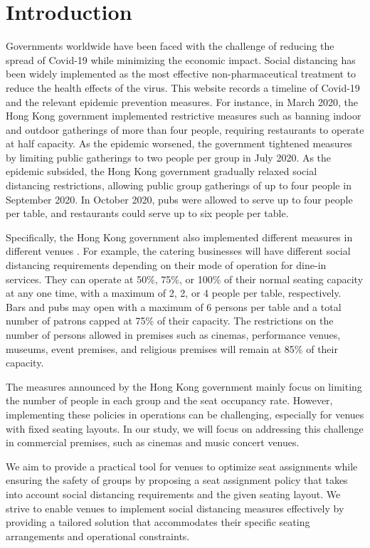\section{Introduction}
Governments worldwide have been faced with the challenge of reducing the spread of Covid-19 while minimizing the economic impact. Social distancing has been widely implemented as the most effective non-pharmaceutical treatment to reduce the health effects of the virus. 
This website records a timeline of Covid-19 and the relevant epidemic prevention measures\cite{Covid19Timeline}. For instance, in March 2020, the Hong Kong government implemented restrictive measures such as banning indoor and outdoor gatherings of more than four people, requiring restaurants to operate at half capacity. As the epidemic worsened, the government tightened measures by limiting public gatherings to two people per group in July 2020. As the epidemic subsided, the Hong Kong government gradually relaxed social distancing restrictions, allowing public group gatherings of up to four people in September 2020. In October 2020, pubs were allowed to serve up to four people per table, and restaurants could serve up to six people per table. 

Specifically, the Hong Kong government also implemented different measures in different venues \cite{Gov202209}. For example, the catering businesses will have different social distancing requirements depending on their mode of operation for dine-in services. They can operate at 50\%, 75\%, or 100\% of their normal seating capacity at any one time, with a maximum of 2, 2, or 4 people per table, respectively. Bars and pubs may open with a maximum of 6 persons per table and a total number of patrons capped at 75\% of their capacity. The restrictions on the number of persons allowed in premises such as cinemas, performance venues, museums, event premises, and religious premises will remain at 85\% of their capacity.

The measures announced by the Hong Kong government mainly focus on limiting the number of people in each group and the seat occupancy rate. However, implementing these policies in operations can be challenging, especially for venues with fixed seating layouts. In our study, we will focus on addressing this challenge in commercial premises, such as cinemas and music concert venues.

We aim to provide a practical tool for venues to optimize seat assignments while ensuring the safety of groups by proposing a seat assignment policy that takes into account social distancing requirements and the given seating layout. We strive to enable venues to implement social distancing measures effectively by providing a tailored solution that accommodates their specific seating arrangements and operational constraints.

